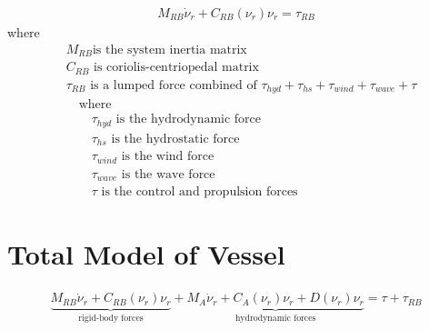 \begin{align}
M_{RB} \dot \nu_r + C_{RB}(\nu_r)\nu_r = \tau_{RB}
\label{eq:rigidmodel}
\end{align}
where
\begin{align}
&M_{RB} \text{is the system inertia matrix}\nonumber\\
&C_{RB} \text{ is coriolis-centriopedal matrix}\nonumber\\
&\tau_{RB} \text{ is a lumped force combined of } \tau_{hyd} + \tau_{hs} + \tau_{wind} + \tau_{wave} + \tau\nonumber\\
&\quad \text{where}\nonumber\\
&\qquad \tau_{hyd} \text{ is the hydrodynamic force}\nonumber\\
&\qquad \tau_{hs} \text{ is the hydrostatic force}\nonumber\\
&\qquad \tau_{wind} \text{ is the wind force}\nonumber\\
&\qquad \tau_{wave} \text{ is the wave force}\nonumber\\
&\qquad \tau \text{ is the control and propulsion forces}\nonumber
\end{align}

\section{Total Model of Vessel}
\begin{align}
\underbrace{M_{RB} \dot \nu_r + C_{RB}(\nu_r)\nu_r}_{\text{rigid-body forces}} + \underbrace{M_A \dot \nu_r + C_A(\nu_r)\nu_r + D(\nu_r)\nu_r}_{\text{hydrodynamic forces}}  = \tau + \tau_{RB}
\label{eq:totmodel}
\end{align}

